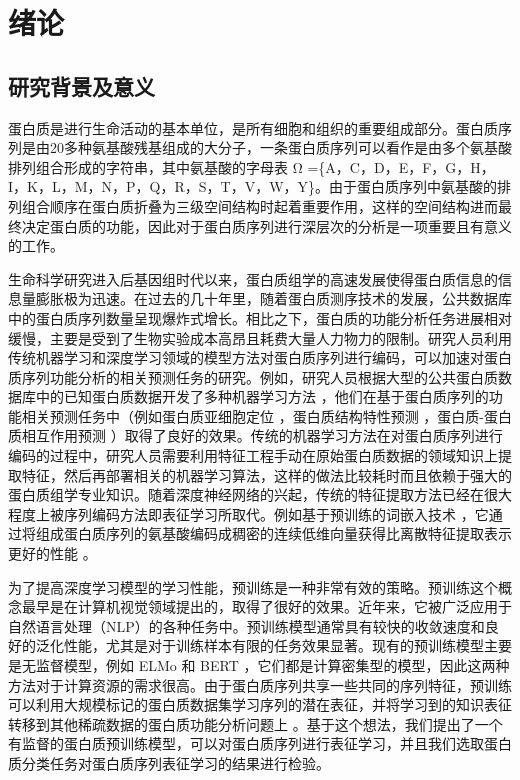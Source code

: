 
\chapter{绪论}

\section{研究背景及意义}
蛋白质是进行生命活动的基本单位，是所有细胞和组织的重要组成部分。蛋白质序列是由20多种氨基酸残基组成的大分子，一条蛋白质序列可以看作是由多个氨基酸排列组合形成的字符串，其中氨基酸的字母表 Ω =\{A，C，D，E，F，G，H，I，K，L，M，N，P，Q，R，S，T，V，W，Y\}。由于蛋白质序列中氨基酸的排列组合顺序在蛋白质折叠为三级空间结构时起着重要作用，这样的空间结构进而最终决定蛋白质的功能，因此对于蛋白质序列进行深层次的分析是一项重要且有意义的工作。

生命科学研究进入后基因组时代以来，蛋白质组学的高速发展使得蛋白质信息的信息量膨胀极为迅速。在过去的几十年里，随着蛋白质测序技术的发展，公共数据库中的蛋白质序列数量呈现爆炸式增长。相比之下，蛋白质的功能分析任务进展相对缓慢，主要是受到了生物实验成本高昂且耗费大量人力物力的限制。研究人员利用传统机器学习和深度学习领域的模型方法对蛋白质序列进行编码，可以加速对蛋白质序列功能分析的相关预测任务的研究。例如，研究人员根据大型的公共蛋白质数据库中的已知蛋白质数据开发了多种机器学习方法 \cite{min2017deep, almagro2017deeploc}，他们在基于蛋白质序列的功能相关预测任务中（例如蛋白质亚细胞定位 \cite{dong2015bean, cheng2018ploc, nair2005mimicking}，蛋白质结构特性预测 \cite{liu2010high, yang2009prediction}，蛋白质-蛋白质相互作用预测 \cite{qi2005random, qi2006evaluation}）取得了良好的效果。传统的机器学习方法在对蛋白质序列进行编码的过程中，研究人员需要利用特征工程手动在原始蛋白质数据的领域知识上提取特征，然后再部署相关的机器学习算法，这样的做法比较耗时而且依赖于强大的蛋白质组学专业知识。随着深度神经网络的兴起，传统的特征提取方法已经在很大程度上被序列编码方法即表征学习所取代。例如基于预训练的词嵌入技术 \cite{mikolov2013distributed, pennington2014glove}，它通过将组成蛋白质序列的氨基酸编码成稠密的连续低维向量获得比离散特征提取表示更好的性能 \cite{asgari2015continuous, heinzinger2019modeling, hamid2019identifying}。

为了提高深度学习模型的学习性能，预训练是一种非常有效的策略。预训练这个概念最早是在计算机视觉领域提出的，取得了很好的效果。近年来，它被广泛应用于自然语言处理（NLP）的各种任务中。预训练模型通常具有较快的收敛速度和良好的泛化性能，尤其是对于训练样本有限的任务效果显著。现有的预训练模型主要是无监督模型，例如 ELMo \cite{peters1802deep} 和 BERT \cite{devlin2018bert}，它们都是计算密集型的模型，因此这两种方法对于计算资源的需求很高。由于蛋白质序列共享一些共同的序列特征，预训练可以利用大规模标记的蛋白质数据集学习序列的潜在表征，并将学习到的知识表征转移到其他稀疏数据的蛋白质功能分析问题上 \cite{filipavicius2020pre, min2021pre}。基于这个想法，我们提出了一个有监督的蛋白质预训练模型，可以对蛋白质序列进行表征学习，并且我们选取蛋白质分类任务对蛋白质序列表征学习的结果进行检验。 

